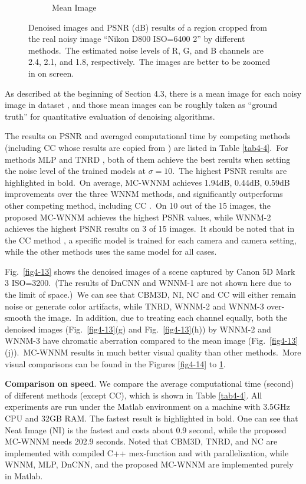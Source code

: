 \begin{figure}
\begin{subfigure}[t]{0.19\textwidth}
		\caption{Mean Image}
    \end{subfigure}
    \caption{Denoised images and PSNR (dB) results of a region cropped from the real noisy image ``Nikon D800 ISO=6400 2'' \cite{crosschannel2016} by different methods.\ The estimated noise levels of R, G, and B channels are 2.4, 2.1, and 1.8, respectively.\ The images are better to be zoomed in on screen.}
    \label{fig4-17}
\end{figure}


\quad As described at the beginning of Section 4.3, there is a mean image for each noisy image in dataset \cite{crosschannel2016}, and those mean images can be roughly taken as ``ground truth'' for quantitative evaluation of denoising algorithms.

The results on PSNR and averaged computational time by competing methods (including CC \cite{crosschannel2016} whose results are copied from \cite{crosschannel2016}) are listed in Table \ref{tab4-4}.\ For methods MLP \cite{mlp} and TNRD \cite{tnrd}, both of them achieve the best results when setting the noise level of the trained models at $\sigma=10$.\ The highest PSNR results are highlighted in bold.\ On average, MC-WNNM achieves 1.94dB, 0.44dB, 0.59dB improvements over the three WNNM methods, and significantly outperforms other competing method, including CC \cite{crosschannel2016}.\ On 10 out of the 15 images, the proposed MC-WNNM achieves the highest PSNR values, while WNNM-2 achieves the highest PSNR results on 3 of 15 images.\ It should be noted that in the CC method \cite{crosschannel2016}, a specific model is trained for each camera and camera setting, while the other methods uses the same model for all cases. 

Fig.\ \ref{fig4-13} shows the denoised images of a scene captured by Canon 5D Mark 3 ISO=3200.\ (The results of DnCNN and WNNM-1 are not shown here due to the limit of space.)\ We can see that CBM3D, NI, NC and CC will either remain noise or generate color artifacts, while TNRD, WNNM-2 and WNNM-3 over-smooth the image.\ In addition, due to treating each channel equally, both the denoised images (Fig.\ \ref{fig4-13}(g) and Fig.\ \ref{fig4-13}(h)) by WNNM-2 and WNNM-3 have chromatic aberration compared to the mean image (Fig.\ \ref{fig4-13}(j)).\ MC-WNNM results in much better visual quality than other methods.\ More visual comparisons can be found in the Figures \ref{fig4-14} to \ref{fig4-17}.

\textbf{Comparison on speed}. We compare the average computational time (second) of different methods (except CC), which is shown in Table \ref{tab4-4}. All experiments are run under the Matlab environment on a machine with 3.5GHz CPU and 32GB RAM. The fastest result is highlighted in bold. One can see that Neat Image (NI) is the fastest and costs about 0.9 second, while the proposed MC-WNNM needs 202.9 seconds. Noted that CBM3D, TNRD, and NC are implemented with compiled C++ mex-function and with parallelization, while WNNM, MLP, DnCNN, and the proposed MC-WNNM are implemented purely in Matlab.


